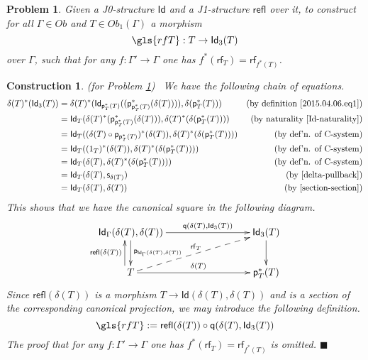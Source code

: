 \documentclass[12pt]{article}
\numberwithin{equation}{section}
\newenvironment{eq}{\begin{equation}}{\end{equation}}
\newtheorem{problem}[proposition]{Problem}
\newtheorem{construction0}[proposition]{Construction}
\newenvironment{construction}[1]{\begin{construction0}(for Problem \ref{#1})\ }{$\blacksquare$ \end{construction0}}
\newcommand{\by}[1]{\text{(by #1)}}
\newcommand{\sr}{\rightarrow}
\newcommand{\p}{\mathsf{p}}
\newcommand{\q}{\mathsf{q}}
\newcommand{\s}{\mathsf{s}}     %
\newcommand{\Id}{\mathsf{Id}} %
\newcommand{\Idx}{\mathsf{Id}_3} %
\newcommand{\refl}{\mathsf{refl}}
\newcommand{\rf}{\mathsf{rf}}
\begin{document}
\begin{problem}
\label{2015.03.27.prob2} Given a J0-structure $\Id$ and a J1-structure $\refl$
over it, to construct for all $\Gamma\in Ob$ and $T\in Ob_1(\Gamma)$ a morphism
%
$$\gls{rfT} : T \sr \Idx(T)$$
%
over $\Gamma$,
such that for any $f:\Gamma'\sr \Gamma$ one has $f^*(\rf_T)=\rf_{f^*(T)}$.
\end{problem}
%
\begin{construction}{2015.03.27.prob2}
\label{2015.03.27.constr2}\rm We have the following chain of equations.
%
\begin{align*}
  \delta(T)^*(\Idx(T)) & = \delta(T)^*(\Id_{\p_T^*(T)}((\p_{\p_T^*(T)}^*(\delta(T)))),\delta(\p_T^*(T)))
  & \by{definition \ref{2015.04.06.eq1}} \\
  & = \Id_T(\delta(T)^*(\p_{\p_T^*(T)}^*(\delta(T))),\delta(T)^*(\delta(\p_T^*(T))))
  & \by{naturality \ref{Id-naturality}} \\
  & = \Id_T((\delta(T) \circ \p_{\p_T^*(T)})^*(\delta(T)),\delta(T)^*(\delta(\p_T^*(T))))
  & \by{def'n{.} of C-system} \\
  & = \Id_T((1_T)^*(\delta(T)),\delta(T)^*(\delta(\p_T^*(T)))) 
  & \by{def'n{.} of C-system} \\
  & = \Id_T(\delta(T),\delta(T)^*(\delta(\p_T^*(T)))) 
  & \by{def'n{.} of C-system} \\
  & = \Id_T(\delta(T),\s_{\delta(T)})
  & \by{\ref{delta-pullback}}  \\
  & = \Id_T(\delta(T),\delta(T))
  & \by{\ref{section-section}} 
\end{align*}
%
This shows that we have the canonical square in the following diagram.
%
\begin{eq}
\label{2015.03.31.eq3}
\begin{xy}
          \xymatrix@C=7pc{ \Id_\Gamma(\delta(T),\delta(T))
            \ar[r]^-{\q(\delta(T),\Idx(T))} \ar[d]^{\p_{\Id_\Gamma(\delta(T),\delta(T))}} & \Idx(T) \ar[d]\\ T
            \ar[r]^{\delta(T)} \ar@<6pt>[u]^{\refl(\delta(T))} \ar@{-->}[ru]^{\rf_T}
            & \p_T^*(T) }
       \end{xy}
\end{eq}%
%
Since $\refl(\delta(T))$ is a morphism $T\sr \Id(\delta(T),\delta(T))$
and is a section of the corresponding canonical projection,
we may introduce the following definition.
%
\begin{eq}
\label{2015.04.02.eq1} \gls{rfT} :=\refl(\delta(T))\circ \q(\delta(T),\Idx(T))
\end{eq}%
%
The proof that for any $f:\Gamma'\sr \Gamma$ one has $f^*(\rf_T)=\rf_{f^*(T)}$ is
omitted.
\end{construction}
\end{document}
